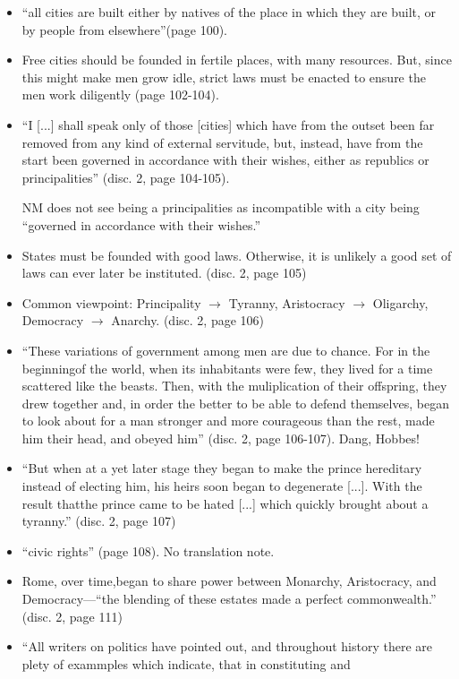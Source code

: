 \documentclass[11pt]{article}
\newcommand{\comment}[1]{{\color{Cerulean}#1}}
\newcommand{\keyquote}[1]{{\color{BrickRed}#1}}
\newcommand{\p}{page }
\renewcommand{\d}{disc. }
\begin{document}
\begin{itemize}
\item
	``all cities are built either by natives of the place in which they are 
	built, or by people from elsewhere''(\p 100).
\item
	Free cities should be founded in fertile places, with many resources.
	But, since this might make men grow idle, strict laws must be enacted
	to ensure the men work diligently (\p 102-104). 
\item
	``I [...] shall speak only of those [cities] which have from the outset
	been far removed from any kind of external servitude, but, instead,
	have from the start been governed in accordance with their wishes, either
	as republics or principalities'' (\d 2, \p 104-105). 

	NM does not see being a principalities as incompatible with a city
	being ``governed in accordance with their wishes.''
\item
	States must be founded with good laws. Otherwise, it is unlikely a 
	good set of laws can ever later be instituted. (\d 2, \p 105)
\item 
	Common viewpoint: Principality $\rightarrow$ Tyranny,
	Aristocracy $\rightarrow$ Oligarchy, Democracy $\rightarrow$ Anarchy.
	(\d 2, \p 106)
\item 
	\keyquote{
	``These variations of government among men are due to chance. For in
	the beginningof the world, when its inhabitants were few, they lived for
	a time scattered like the beasts. Then, with the muliplication of their
	offspring, they drew together and, in order the better to be able to
	defend themselves, began to look about for a man stronger and more
	courageous than the rest, made him their head, and obeyed him'' 
	}
    (\d 2, \p 106-107).	\comment{Dang, Hobbes!}
\item 
	``But when at a yet later stage they began to make the prince 
	hereditary instead of electing him, his heirs soon began to
	degenerate [...]. With the result thatthe prince came to be hated [...]
	which quickly brought about a tyranny.'' (\d 2, \p 107)
\item
	``civic rights'' (\p 108). No translation note.
\item
	Rome, over time,began to share power between Monarchy, Aristocracy,
	and Democracy---``the blending of these estates made a perfect
	commonwealth.'' (\d 2, \p 111)
\item
	\keyquote{
	``All writers on politics have pointed out, and throughout history there
	are plety of exammples which indicate, that in constituting and 
}
\end{itemize}
\end{document}
